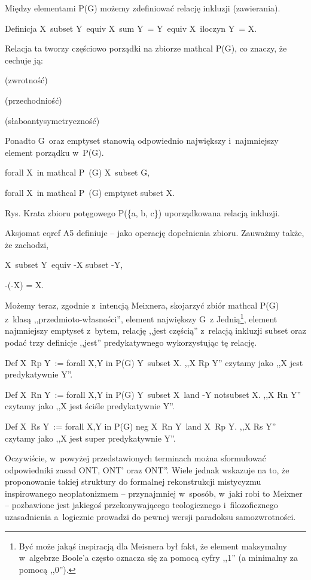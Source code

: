 Między elementami P(G) możemy zdefiniować relację inkluzji (zawierania).

Definicja X~subset Y~equiv X~sum Y~= Y~equiv X~iloczyn Y~= X.

Relacja ta tworzy częściowo porządki na zbiorze mathcal P(G), co znaczy, że cechuje ją:

(zwrotność)

(przechodniość)

(słaboantysymetryczność)

Ponadto G~oraz emptyset stanowią odpowiednio największy i~najmniejszy element porządku w~P(G).

forall X~in mathcal P~(G) X~subset G,

forall X~in mathcal P~(G) emptyset subset X.

Rys. Krata zbioru potęgowego P(\{a, b, c\}) uporządkowana relacją inkluzji.

Aksjomat eqref A5 definiuje -- jako operację dopełnienia zbioru. Zauważmy także, że zachodzi,

X~subset Y~equiv -X subset -Y,

{}-(-X) = X.

Możemy teraz, zgodnie z~intencją Meixnera, skojarzyć zbiór mathcal P(G) z~klasą ,,przedmioto-własności'', element największy G~z Jednią\footnote{ Być może jakąś inspiracją dla Meisnera był fakt, że element maksymalny w~algebrze Boole'a często oznacza się za pomocą cyfry ,,1'' (a minimalny za pomocą ,,0'').}, element najmniejszy emptyset z~bytem, relację ,,jest częścią'' z~relacją inkluzji subset oraz podać trzy definicje ,,jest'' predykatywnego wykorzystując tę relację.

Def X~Rp Y~:= forall X,Y in P(G) Y~subset X. ,,X Rp Y'' czytamy jako ,,X jest predykatywnie Y''.

Def X~Rn Y~:= forall X,Y in P(G) Y~subset X~land -Y notsubset X. ,,X Rn Y'' czytamy jako ,,X jest ściśle predykatywnie Y''.

Def X~Rs Y~:= forall X,Y in P(G) neg X~Rn Y~land X~Rp Y. ,,X Rs Y'' czytamy jako ,,X jest super predykatywnie Y''.

Oczywiście, w~powyżej przedstawionych terminach można sformułować odpowiedniki zasad ONT, ONT' oraz ONT''. Wiele jednak wskazuje na to, że proponowanie takiej struktury do formalnej rekonstrukcji mistycyzmu inspirowanego neoplatonizmem -- przynajmniej w~sposób, w~jaki robi to Meixner -- pozbawione jest jakiegoś przekonywającego teologicznego i~filozoficznego uzasadnienia a~logicznie prowadzi do pewnej wersji paradoksu samozwrotności.

